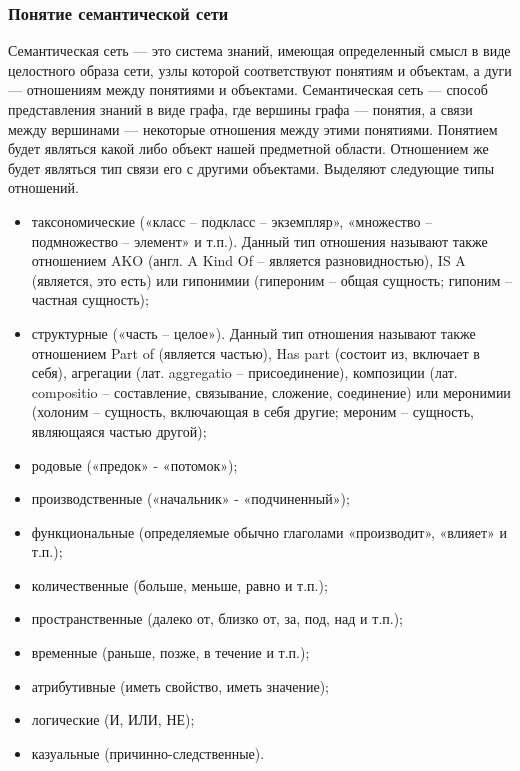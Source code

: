 \subsubsection{Понятие семантической сети}
Семантическая сеть — это система знаний, имеющая определенный смысл в виде целостного образа сети,
узлы которой соответствуют понятиям и объектам,
а дуги — отношениям между понятиями и объектами.
Семантическая сеть — способ представления знаний в виде графа, где вершины графа — понятия, а связи между вершинами — некоторые отношения между этими понятиями.\cite{semnet}
Понятием будет являться какой либо объект нашей предметной области.
Отношением же будет являться тип связи его с другими объектами.
Выделяют следующие типы отношений.
\begin{itemize}
\item таксономические («класс – подкласс – экземпляр», «множество – подмножество – элемент» и т.п.). Данный тип отношения называют также отношением AKO (англ. A Kind Of – является разновидностью), IS A (является, это есть) или гипонимии (гипероним – общая сущность; гипоним – частная сущность);

\item  структурные («часть – целое»). Данный тип отношения называют также отношением Part of (является частью), Has part (состоит из, включает в себя), агрегации (лат. aggregatio – присоединение), композиции (лат. compositio – составление, связывание, сложение, соединение) или меронимии (холоним – сущность, включающая в себя другие; мероним – сущность, являющаяся частью другой);

\item родовые («предок» - «потомок»);

\item  производственные («начальник» - «подчиненный»);

\item  функциональные (определяемые обычно глаголами «производит», «влияет» и т.п.);

\item  количественные (больше, меньше, равно и т.п.);

\item  пространственные (далеко от, близко от, за, под, над и т.п.);

\item временные (раньше, позже, в течение и т.п.);

\item  атрибутивные (иметь свойство, иметь значение);

\item  логические (И, ИЛИ, НЕ);

\item  казуальные (причинно-следственные).
\end{itemize}

